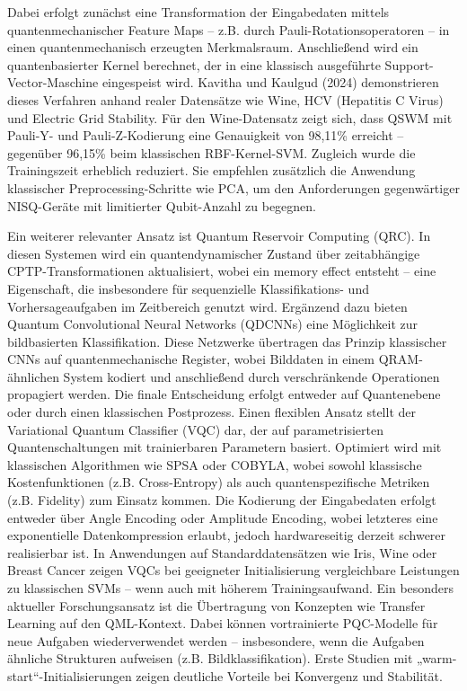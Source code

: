 \noindent
Dabei erfolgt zunächst eine Transformation der Eingabedaten mittels quantenmechanischer Feature Maps – z.B. durch Pauli-Rotationsoperatoren – in einen quantenmechanisch erzeugten Merkmalsraum. Anschließend wird ein quantenbasierter Kernel berechnet, der in eine klassisch ausgeführte Support-Vector-Maschine eingespeist wird. Kavitha und Kaulgud (2024) demonstrieren dieses Verfahren anhand realer Datensätze wie Wine, HCV (Hepatitis C Virus) und Electric Grid Stability. Für den Wine-Datensatz zeigt sich, dass QSWM mit Pauli-Y- und Pauli-Z-Kodierung eine Genauigkeit von 98{,}11\% erreicht – gegenüber 96{,}15\% beim klassischen RBF-Kernel-SVM. Zugleich wurde die Trainingszeit erheblich reduziert. Sie empfehlen zusätzlich die Anwendung klassischer Preprocessing-Schritte wie PCA, um den Anforderungen gegenwärtiger NISQ-Geräte mit limitierter Qubit-Anzahl zu begegnen. \cite{kavithaQuantumMachineLearning2024}

\noindent
Ein weiterer relevanter Ansatz ist Quantum Reservoir Computing (QRC). In diesen Systemen wird ein quantendynamischer Zustand über zeitabhängige CPTP-Transformationen aktualisiert, wobei ein memory effect entsteht – eine Eigenschaft, die insbesondere für sequenzielle Klassifikations- und Vorhersageaufgaben im Zeitbereich genutzt wird.
Ergänzend dazu bieten Quantum Convolutional Neural Networks (QDCNNs) eine Möglichkeit zur bildbasierten Klassifikation. Diese Netzwerke übertragen das Prinzip klassischer CNNs auf quantenmechanische Register, wobei Bilddaten in einem QRAM-ähnlichen System kodiert und anschließend durch verschränkende Operationen propagiert werden. Die finale Entscheidung erfolgt entweder auf Quantenebene oder durch einen klassischen Postprozess. \cite{peral-garciaSystematicLiteratureReview2024}
Einen flexiblen Ansatz stellt der Variational Quantum Classifier (VQC) dar, der auf parametrisierten Quantenschaltungen mit trainierbaren Parametern basiert. Optimiert wird mit klassischen Algorithmen wie SPSA oder COBYLA, wobei sowohl klassische Kostenfunktionen (z.B. Cross-Entropy) als auch quantenspezifische Metriken (z.B. Fidelity) zum Einsatz kommen. Die Kodierung der Eingabedaten erfolgt entweder über Angle Encoding oder Amplitude Encoding, wobei letzteres eine exponentielle Datenkompression erlaubt, jedoch hardwareseitig derzeit schwerer realisierbar ist. In Anwendungen auf Standarddatensätzen wie Iris, Wine oder Breast Cancer zeigen VQCs bei geeigneter Initialisierung vergleichbare Leistungen zu klassischen SVMs – wenn auch mit höherem Trainingsaufwand.
Ein besonders aktueller Forschungsansatz ist die Übertragung von Konzepten wie Transfer Learning auf den QML-Kontext. Dabei können vortrainierte PQC-Modelle für neue Aufgaben wiederverwendet werden – insbesondere, wenn die Aufgaben ähnliche Strukturen aufweisen (z.B. Bildklassifikation). Erste Studien mit „warm-start“-Initialisierungen zeigen deutliche Vorteile bei Konvergenz und Stabilität. \cite{gujjuQuantumMachineLearning2024}

